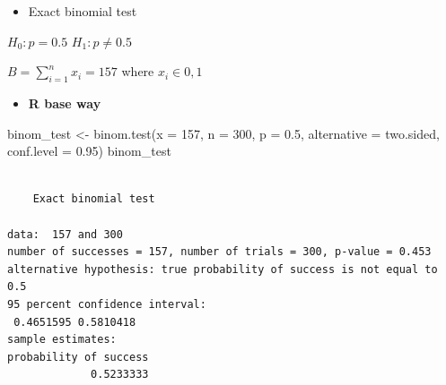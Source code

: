 \documentclass[
  ignorenonframetext,
]{beamer}
\newenvironment{Shaded}{\begin{snugshade}}{\end{snugshade}}
\newcommand{\AttributeTok}[1]{\textcolor[rgb]{0.40,0.45,0.13}{#1}}
\newcommand{\DecValTok}[1]{\textcolor[rgb]{0.68,0.00,0.00}{#1}}
\newcommand{\FloatTok}[1]{\textcolor[rgb]{0.68,0.00,0.00}{#1}}
\newcommand{\FunctionTok}[1]{\textcolor[rgb]{0.28,0.35,0.67}{#1}}
\newcommand{\NormalTok}[1]{\textcolor[rgb]{0.00,0.23,0.31}{#1}}
\newcommand{\OtherTok}[1]{\textcolor[rgb]{0.00,0.23,0.31}{#1}}
\newcommand{\StringTok}[1]{\textcolor[rgb]{0.13,0.47,0.30}{#1}}
\providecommand{\tightlist}{%
  \setlength{\itemsep}{0pt}\setlength{\parskip}{0pt}}\usepackage{longtable,booktabs,array}
\begin{document}
\begin{frame}[fragile]{}
\label{section-10}
\begin{itemize}
\tightlist
\item
  Exact binomial test
\end{itemize}

\(H_0: p = 0.5\) \(H_1: p \neq 0.5\)

\(B = \sum_{i=1}^n x_i = 157\) where \(x_i \in {0,1}\)

\begin{itemize}
\tightlist
\item
  \textbf{R base way}
\end{itemize}

\tiny

\begin{Shaded}
\begin{Highlighting}[]
\NormalTok{binom\_test }\OtherTok{\textless{}{-}} \FunctionTok{binom.test}\NormalTok{(}\AttributeTok{x =} \DecValTok{157}\NormalTok{, }\AttributeTok{n =} \DecValTok{300}\NormalTok{, }\AttributeTok{p =} \FloatTok{0.5}\NormalTok{, }
           \AttributeTok{alternative =} \StringTok{\textquotesingle{}two.sided\textquotesingle{}}\NormalTok{,}
           \AttributeTok{conf.level =} \FloatTok{0.95}\NormalTok{)}
\NormalTok{binom\_test}
\end{Highlighting}
\end{Shaded}

\begin{verbatim}

    Exact binomial test

data:  157 and 300
number of successes = 157, number of trials = 300, p-value = 0.453
alternative hypothesis: true probability of success is not equal to 0.5
95 percent confidence interval:
 0.4651595 0.5810418
sample estimates:
probability of success 
             0.5233333 
\end{verbatim}
\end{frame}
\end{document}
